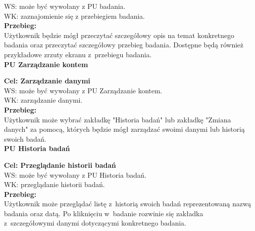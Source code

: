 \documentclass[12pt, letterpaper]{article}
\begin{document}
		WS: może być wywołany z PU badania.\\
		
		WK: zaznajomienie się z przebiegiem badania.\\
		
		\textbf{Przebieg: }\\
		Użytkownik będzie mógł przeczytać szczegółowy opis na temat konkretnego badania oraz przeczytać szczegółowy przebieg badania. Dostępne będą również przykładowe zrzuty ekranu z~przebiegu badania.
		 \\
		 
		
		\textbf{PU Zarządzanie kontem}
		
		\quad
		
		\textbf{Cel: Zarządzanie danymi}\\
		
		WS: może być wywołany z PU Zarządzanie kontem.\\
		
		WK: zarządzanie danymi.\\
		
		\textbf{Przebieg:}\\
		Użytkownik może wybrać zakładkę "Historia badań" lub zakładkę "Zmiana danych" za pomocą, których będzie mógł zarządzać swoimi danymi lub historią swoich badań.
		 \\
		 
		
		\textbf{PU Historia badań}
		
		\quad
		
		\textbf{Cel: Przeglądanie historii badań}\\
		
		WS: może być wywołany z PU Historia badań.\\
		
		WK: przeglądanie historii badań.\\
		
		\textbf{Przebieg:}\\
		Użytkownik może przeglądać listę z~historią swoich badań reprezentowaną nazwą badania oraz datą. Po kliknięciu w~badanie rozwinie się zakładka z~szczegółowymi danymi dotyczącymi konkretnego badania.
		 \\
		 
		
\end{document}
